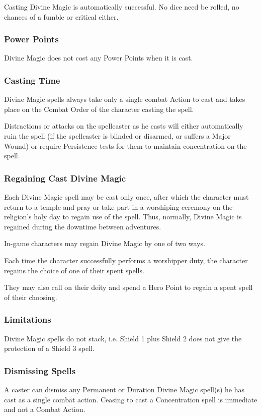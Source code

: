 Casting Divine Magic is automatically successful. No dice need be rolled, no chances of a fumble or critical either.

\subsubsection{Power Points}
Divine Magic does not cost any Power Points when it is cast.

\subsubsection{Casting Time}
Divine Magic spells always take only a single combat Action to cast and takes place on the Combat Order of the character casting the spell.

Distractions or attacks on the spellcaster as he casts will either automatically ruin the spell (if the spellcaster is blinded or disarmed, or suffers a Major Wound) or require Persistence tests for them to maintain concentration on the spell. 

\subsubsection{Regaining Cast Divine Magic}
Each Divine Magic spell may be cast only once, after which the character must return to a temple and pray or take part in a worshiping ceremony on the religion’s holy day to regain use of the spell. Thus, normally, Divine Magic is regained during the downtime between adventures.

In-game characters may regain Divine Magic by one of two ways.
\begin{rpg-list}
\item Each time the character successfully performs a worshipper duty, the character regains the choice of one of their spent spells.
\item They may also call on their deity and spend a Hero Point to regain a spent spell of their choosing.
\end{rpg-list}


\subsubsection{Limitations}
Divine Magic spells do not stack, i.e. Shield 1 plus Shield 2 does not give the protection of a Shield 3 spell.

\subsubsection{Dismissing Spells}
A caster can dismiss any Permanent or Duration Divine Magic spell(s) he has cast as a single combat action. Ceasing to cast a Concentration spell is immediate and not a Combat Action.



